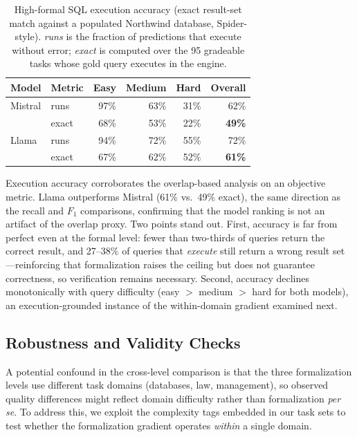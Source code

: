 \documentclass[runningheads]{llncs}
\begin{document}
\begin{table}[htbp]
\centering
\caption{High-formal SQL execution accuracy (exact result-set match against a populated Northwind database, Spider-style). \emph{runs} is the fraction of predictions that execute without error; \emph{exact} is computed over the 95 gradeable tasks whose gold query executes in the engine.}
\label{tab:sql-exec}
\setlength{\tabcolsep}{6pt}
\begin{tabular}{llrrrr}
\toprule
Model & Metric & Easy & Medium & Hard & Overall \\
\midrule
Mistral & runs   & 97\% & 63\% & 31\% & 62\% \\
        & exact  & 68\% & 53\% & 22\% & \textbf{49\%} \\
\addlinespace
Llama   & runs   & 94\% & 72\% & 55\% & 72\% \\
        & exact  & 67\% & 62\% & 52\% & \textbf{61\%} \\
\bottomrule
\end{tabular}
\end{table}

Execution accuracy corroborates the overlap-based analysis on an objective metric. Llama outperforms Mistral (61\% vs.\ 49\% exact), the same direction as the recall and $F_1$ comparisons, confirming that the model ranking is not an artifact of the overlap proxy. Two points stand out. First, accuracy is far from perfect even at the formal level: fewer than two-thirds of queries return the correct result, and 27--38\% of queries that \emph{execute} still return a wrong result set---reinforcing that formalization raises the ceiling but does not guarantee correctness, so verification remains necessary. Second, accuracy declines monotonically with query difficulty (easy $>$ medium $>$ hard for both models), an execution-grounded instance of the within-domain gradient examined next.

\subsection{Robustness and Validity Checks}
\label{sec:within-domain}

A potential confound in the cross-level comparison is that the three formalization levels use different task domains (databases, law, management), so observed quality differences might reflect domain difficulty rather than formalization \textit{per se}. To address this, we exploit the complexity tags embedded in our task sets to test whether the formalization gradient operates \emph{within} a single domain.
\end{document}
